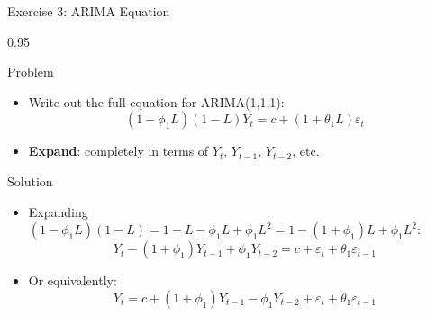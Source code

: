 \documentclass[9pt, aspectratio=169, t]{beamer}
\begin{document}
\begin{frame}{Exercise 3: ARIMA Equation}
    \begin{cminipage}{0.95\textwidth}
    \begin{alertblock}{Problem}
        \begin{itemize}\setlength{\itemsep}{0pt}
            \item Write out the full equation for ARIMA(1,1,1):
            $$(1-\phi_1 L)(1-L)Y_t = c + (1+\theta_1 L)\varepsilon_t$$
            \item \textbf{Expand}: completely in terms of $Y_t$, $Y_{t-1}$, $Y_{t-2}$, etc.
        \end{itemize}
    \end{alertblock}

    \vspace{0.2cm}
    \begin{exampleblock}{Solution}
        \begin{itemize}\setlength{\itemsep}{0pt}
            \item Expanding $(1-\phi_1 L)(1-L) = 1 - L - \phi_1 L + \phi_1 L^2 = 1 - (1+\phi_1)L + \phi_1 L^2$:
            $$Y_t - (1+\phi_1)Y_{t-1} + \phi_1 Y_{t-2} = c + \varepsilon_t + \theta_1 \varepsilon_{t-1}$$
            \item Or equivalently:
            $$Y_t = c + (1+\phi_1)Y_{t-1} - \phi_1 Y_{t-2} + \varepsilon_t + \theta_1 \varepsilon_{t-1}$$
        \end{itemize}
    \end{exampleblock}
    \end{cminipage}
\end{frame}
\end{document}
